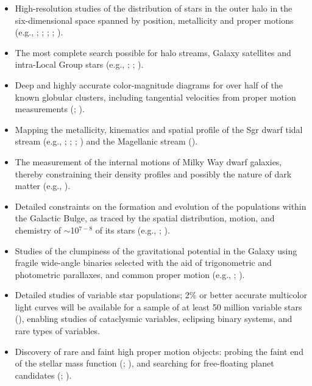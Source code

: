 \begin{itemize}
\item High-resolution studies of the distribution of stars in the outer halo
          in the six-dimensional space spanned by position, metallicity and proper
          motions (e.g., \cite{Girard2006}; \cite{Bell2008}; \cite{Juric2008};
          \cite{Ivezic2008a}; \cite{Bond2010}).
\item The most complete search possible for halo streams, Galaxy satellites and intra-Local Group
          stars (e.g., \cite{Belokurov2007a}; \cite{Walsh2009}; \cite{Bochanski2014}).
\item Deep and highly accurate color-magnitude diagrams for over half of the known
          globular clusters, including tangential velocities from proper motion
          measurements (\cite{An2008}; \cite{CasettiDinescu2007}).
\item Mapping the metallicity, kinematics and spatial profile of the Sgr dwarf tidal
          stream (e.g., \cite{Ibata2001}; \cite{Majewski2003}; \cite{Law2005}; \cite{Belokurov2014})
          and the Magellanic stream (\cite{Zaritsky2004}).
\item The measurement of the internal motions of Milky Way dwarf
          galaxies, thereby constraining their density profiles and
	  possibly the nature of dark matter (e.g., \cite{Walker2011}).
\item Detailed constraints on the formation and evolution of the populations within the Galactic Bulge, as traced by the spatial
          distribution, motion, and chemistry of $\sim$10$^{7-8}$ of its stars (e.g., \cite{Hill2011}; \cite{Ness2014}).
\item Studies of the clumpiness of the gravitational potential in the Galaxy using
          fragile wide-angle binaries selected with the aid of trigonometric and
          photometric parallaxes, and common proper motion (e.g., \cite{Yoo2004}; \cite{Longhitano2010}).
\item Detailed studies of variable star populations; 2\% or better accurate
          multicolor light curves will be available for a sample of at least 50
          million variable stars (\cite{Sesar2007}), enabling studies of
          cataclysmic variables, eclipsing binary systems, and rare types of variables.
\item Discovery of rare and faint high proper motion objects: probing the
          faint end of the stellar mass function (\cite{Lepine2008}; \cite{Finch2010}), and searching for
          free-floating planet candidates (\cite{Lucas2000}; \cite{Luhman2014}).

\end{itemize}
